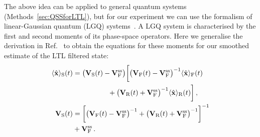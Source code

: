 \documentclass[aps,prx,twocolumn,amsmath,amssymb,superscriptaddress,floatfix,longbibliography
]{revtex4-2}
\begin{document}
The above idea can be applied to general quantum systems (Methods~\ref{sec:QSSforLTL}), but for our experiment we can use the formalism of linear-Gaussian quantum (LGQ) systems~\cite{laverick2019quantum}. 
A LGQ system is characterised by the first and second moments of its phase-space operators. Here we generalise the derivation in Ref.~\cite{laverick2021linear} to obtain the equations for these moments for our smoothed estimate of the LTL filtered state:
\begin{align}
\begin{aligned}
    \langle\hat{\mathbf{x}}\rangle_{\text S}(t) & = \big(\mathbf{V}_{\text S}(t)-\mathbf{V}_{\text F}^\text{ss}\big)\biggl[
    \big(\mathbf{V}_{\text F}(t)-\mathbf{V}_{\text F}^\text{ss}\big)^{-1} \langle\hat{\mathbf{x}}\rangle_{\text F}(t) \\
    &\hspace{5em}+ \big(\mathbf{V}_{\text R}(t)+\mathbf{V}_{\text F}^\text{ss}\big)^{-1} \langle\hat{\mathbf{x}}\rangle_{\text R}(t)\biggr]\,, \\
    \mathbf{V}_{\text S}(t) & = \biggl[\big(\mathbf{V}_{\text F}(t)-\mathbf{V}_{\text F}^\text{ss}\big)^{-1}+\big(\mathbf{V}_{\text R}(t)+\mathbf{V}_{\text F}^\text{ss}\big)^{-1}\biggr]^{-1}\\
    &+\mathbf{V}_{\text F}^\text{ss}\,.
    \label{QSSforLTLfil}
\end{aligned}
\end{align} 
\end{document}
